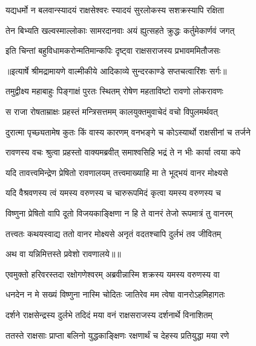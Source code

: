 \twolineshloka
{यद्यधर्मो न बलवान्स्यादयं राक्षसेश्वरः}
{स्यादयं सुरलोकस्य सशक्रस्यापि रक्षिता} %

\twolineshloka
{तेन बिभ्यति खल्वस्माल्लोकाः सामरदानवाः}
{अयं ह्युत्सहते क्रुद्धः कर्तुमेकार्णवं जगत्} %

\twolineshloka
{इति चिन्तां बहुविधामकरोन्मतिमान्कपिः}
{दृष्ट्वा राक्षसराजस्य प्रभावममितौजसः} %


{॥इत्यार्षे श्रीमद्रामायणे वाल्मीकीये आदिकाव्ये सुन्दरकाण्डे सप्तचत्वारिंशः सर्गः॥}


\twolineshloka
{तमुद्वीक्ष्य महाबाहुः पिङ्गाक्षं पुरतः स्थितम्}
{रोषेण महताविष्टो रावणो लोकरावणः} %

\twolineshloka
{स राजा रोषताम्राक्षः प्रहस्तं मन्त्रिसत्तमम्}
{कालयुक्तमुवाचेदं वचो विपुलमर्थवत्} %

\twolineshloka
{दुरात्मा पृच्छ्यतामेष कुतः किं वास्य कारणम्}
{वनभङ्गे च कोऽस्यार्थो राक्षसीनां च तर्जने} %

\twolineshloka
{रावणस्य वचः श्रुत्वा प्रहस्तो वाक्यमब्रवीत्}
{समाश्वसिहि भद्रं ते न भीः कार्या त्वया कपे} %

\twolineshloka
{यदि तावत्त्वमिन्द्रेण प्रेषितो रावणालयम्}
{तत्त्वमाख्याहि मा ते भूद्भयं वानर मोक्ष्यसे} %

\twolineshloka
{यदि वैश्रवणस्य त्वं यमस्य वरुणस्य च}
{चारुरूपमिदं कृत्वा यमस्य वरुणस्य च} %

\twolineshloka
{विष्णुना प्रेषितो वापि दूतो विजयकाङ्क्षिणा}
{न हि ते वानरं तेजो रूपमात्रं तु वानरम्} %

\twolineshloka
{तत्त्वतः कथयस्वाद्य ततो वानर मोक्ष्यसे}
{अनृतं वदतश्चापि दुर्लभं तव जीवितम्} %

{अथ वा यन्निमित्तस्ते प्रवेशो रावणालये॥॥} %

\addtocounter{shlokacount}{1}

\twolineshloka
{एवमुक्तो हरिवरस्तदा रक्षोगणेश्वरम्}
{अब्रवीन्नास्मि शक्रस्य यमस्य वरुणस्य वा} %

\twolineshloka
{धनदेन न मे सख्यं विष्णुना नास्मि चोदितः}
{जातिरेव मम त्वेषा वानरोऽहमिहागतः} %

\twolineshloka
{दर्शने राक्षसेन्द्रस्य दुर्लभे तदिदं मया}
{वनं राक्षसराजस्य दर्शनार्थे विनाशितम्} %

\twolineshloka
{ततस्ते राक्षसाः प्राप्ता बलिनो युद्धकाङ्क्षिणः}
{रक्षणार्थं च देहस्य प्रतियुद्धा मया रणे} %

